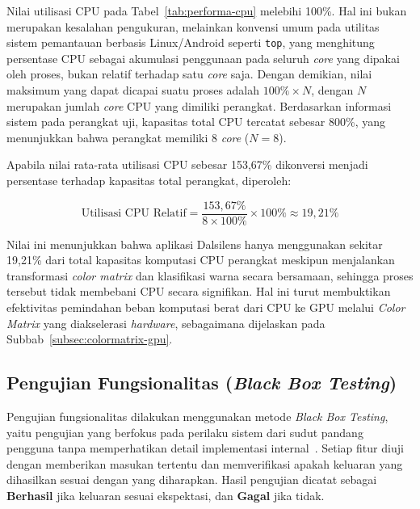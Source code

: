 Nilai utilisasi CPU pada Tabel~\ref{tab:performa-cpu} melebihi 100\%.
Hal ini bukan merupakan kesalahan pengukuran, melainkan konvensi umum pada utilitas sistem pemantauan berbasis Linux/Android seperti \texttt{top}, yang menghitung persentase CPU sebagai akumulasi penggunaan pada seluruh \textit{core} yang dipakai oleh proses, bukan relatif terhadap satu \textit{core} saja.
Dengan demikian, nilai maksimum yang dapat dicapai suatu proses adalah $100\% \times N$, dengan $N$ merupakan jumlah \textit{core} CPU yang dimiliki perangkat.
Berdasarkan informasi sistem pada perangkat uji, kapasitas total CPU tercatat sebesar 800\%, yang menunjukkan bahwa perangkat memiliki 8 \textit{core} ($N = 8$).

Apabila nilai rata-rata utilisasi CPU sebesar 153,67\% dikonversi menjadi persentase terhadap kapasitas total perangkat, diperoleh:

\begin{equation}
  \text{Utilisasi CPU Relatif} = \frac{153{,}67\%}{8 \times 100\%} \times 100\% \approx 19{,}21\%
  \label{eq:cpu-relatif}
\end{equation}

Nilai ini menunjukkan bahwa aplikasi Dalsilens hanya menggunakan sekitar 19,21\% dari total kapasitas komputasi CPU perangkat meskipun menjalankan transformasi \textit{color matrix} dan klasifikasi warna secara bersamaan, sehingga proses tersebut tidak membebani CPU secara signifikan.
Hal ini turut membuktikan efektivitas pemindahan beban komputasi berat dari CPU ke GPU melalui \textit{Color Matrix} yang diakselerasi \textit{hardware}, sebagaimana dijelaskan pada Subbab~\ref{subsec:colormatrix-gpu}.

\subsection{Pengujian Fungsionalitas (\textit{Black Box Testing})}

Pengujian fungsionalitas dilakukan menggunakan metode \textit{Black Box Testing}, yaitu pengujian yang berfokus pada perilaku sistem dari sudut pandang pengguna tanpa memperhatikan detail implementasi internal~\parencite{dicoding_blackbox}.
Setiap fitur diuji dengan memberikan masukan tertentu dan memverifikasi apakah keluaran yang dihasilkan sesuai dengan yang diharapkan.
Hasil pengujian dicatat sebagai \textbf{Berhasil} jika keluaran sesuai ekspektasi, dan \textbf{Gagal} jika tidak.

